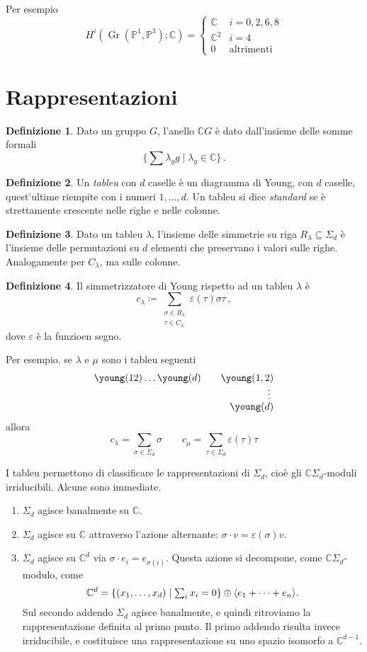 \documentclass[a4paper, 11pt]{article}
\theoremstyle{definition}
\newtheorem{Def}{Definizione}[section]
\theoremstyle{plain}
\DeclarePairedDelimiter{\ang}{\langle}{\rangle}
\renewcommand{\epsilon}{\varepsilon}
\newcommand{\PP}{\mathbb{P}}
\newcommand{\C}{\mathbb{C}}
\newcommand{\deff}{\coloneqq}
\DeclareMathOperator{\Gr}{Gr}
\begin{document}
Per esempio
\[
	H^i(\Gr(\PP^1, \PP^3);\C) = 
	\begin{cases}
		\C & i = 0,2,6,8\\
		\C^2 & i = 4\\
		0 &\text{altrimenti}
	\end{cases}
\]
\section{Rappresentazioni}

\begin{Def}
	Dato un gruppo $G$, l'anello $ \C G$ è dato dall'insieme delle somme formali 
	\[
		\{\sum \lambda_g g \mid \lambda_g \in \C\}\,.
	\]
\end{Def}
\begin{Def}
	Un \emph{tableu} con $d$ caselle è un diagramma di Young, con $d$ caselle, quest'ultime riempite con i numeri $1, \dots, d$. Un tableu si dice \emph{standard} se è strettamente crescente nelle righe e nelle colonne.
\end{Def}
\begin{Def}
	Dato un tableu $\lambda$, l'insieme delle simmetrie su riga $R_\lambda \subseteq \Sigma_d$ è l'insieme delle permutazioni su $d$ elementi che preservano i valori sulle righe. Analogamente per $C_\lambda$, ma sulle colonne.
\end{Def}
\begin{Def}
	Il simmetrizzatore di Young rispetto ad un tableu $\lambda$ è
	\[
		c_\lambda \deff \sum_{\substack{\sigma \in R_\lambda \\ \tau \in C_\lambda}}\epsilon(\tau)\sigma\tau\,,
	\]
	dove $\epsilon$ è la funzioen segno.
\end{Def}

Per esempio. se $\lambda$ e $\mu$ sono i tableu seguenti
\[
\begin{split}
	\young(12)\dots\young(d) \qquad \young(1,2)&\\[-1ex]
	\vdots\ & \\[-1ex]
	\young(d)&
\end{split}
\]
allora 
\[
	c_\lambda = \sum_{\sigma \in \Sigma_d} \sigma \qquad c_\mu = \sum_{\tau \in \Sigma_d}\epsilon(\tau)\tau
\]

I tableu permettono di classificare le rappresentazioni di $\Sigma_d$, cioè gli $\C \Sigma_d$-moduli irriducibili. Alcune sono immediate.
\begin{enumerate}
	\item $\Sigma_d$ agisce banalmente su $\C$.
	\item $\Sigma_d$ agisce su $\C$ attraverso l'azione alternante: $\sigma \cdot v = \epsilon(\sigma)v$.
	\item $\Sigma_d$ agisce su $\C^d$ via $\sigma \cdot e_i = e_{\sigma(i)}$. Questa azione si decompone, come $\C \Sigma_d$-modulo, come
	\[
		\C^d = \{(x_1, \dots, x_d) \mid \textstyle \sum_i x_i = 0\} \oplus \ang{e_1 + \dots + e_n}.
	\]
	Sul secondo addendo $\Sigma_d$ agisce banalmente, e quindi ritroviamo la rappresentazione definita al primo punto. Il primo addendo risulta invece irriducibile, e costituisce una rappresentazione su uno spazio isomorfo a $\C^{d-1}$.
\end{enumerate}
\end{document}

